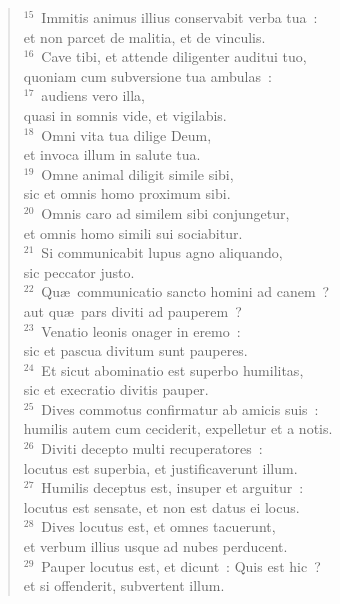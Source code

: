 \begin{verse}
${}^{15}$~Immitis animus illius conservabit verba tua~:\\ et non parcet de malitia, et de vinculis.\\
${}^{16}$~Cave tibi, et attende diligenter auditui tuo,\\ quoniam cum subversione tua ambulas~:\\
${}^{17}$~audiens vero illa,\\ quasi in somnis vide, et vigilabis.\\
${}^{18}$~Omni vita tua dilige Deum,\\ et invoca illum in salute tua.\\
${}^{19}$~Omne animal diligit simile sibi,\\ sic et omnis homo proximum sibi.\\
${}^{20}$~Omnis caro ad similem sibi conjungetur,\\ et omnis homo simili sui sociabitur.\\
${}^{21}$~Si communicabit lupus agno aliquando,\\ sic peccator justo.\\
${}^{22}$~Qu\ae\ communicatio sancto homini ad canem~?\\ aut qu\ae\ pars diviti ad pauperem~?\\
${}^{23}$~Venatio leonis onager in eremo~:\\ sic et pascua divitum sunt pauperes.\\
${}^{24}$~Et sicut abominatio est superbo humilitas,\\ sic et execratio divitis pauper.\\
${}^{25}$~Dives commotus confirmatur ab amicis suis~:\\ humilis autem cum ceciderit, expelletur et a notis.\\
${}^{26}$~Diviti decepto multi recuperatores~:\\ locutus est superbia, et justificaverunt illum.\\
${}^{27}$~Humilis deceptus est, insuper et arguitur~:\\ locutus est sensate, et non est datus ei locus.\\
${}^{28}$~Dives locutus est, et omnes tacuerunt,\\ et verbum illius usque ad nubes perducent.\\
${}^{29}$~Pauper locutus est, et dicunt~: Quis est hic~?\\ et si offenderit, subvertent illum.\end{verse}


